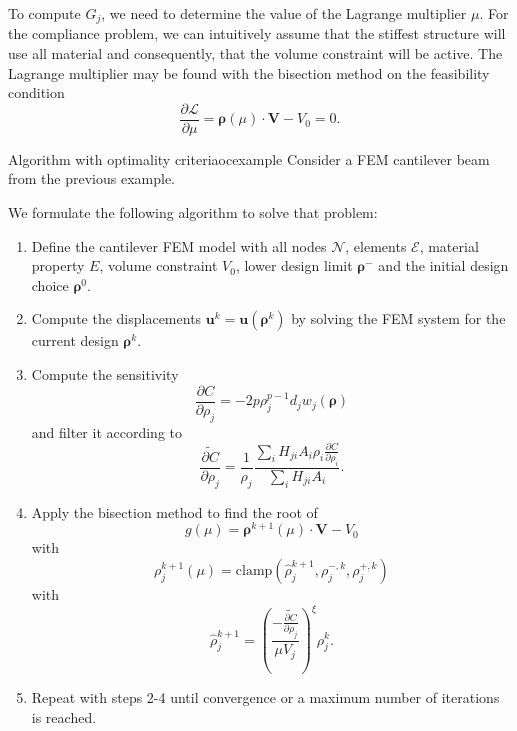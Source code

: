 To compute $G_j$, we need to determine the value of the Lagrange multiplier $\mu$. For the compliance problem, we can intuitively assume that the stiffest structure will use all material and consequently, that the volume constraint will be active. The Lagrange multiplier may be found with the bisection method on the feasibility condition
\begin{equation}
    \frac{\partial \mathcal{L}}{\partial \mu} = \pmb{\rho}(\mu) \cdot \mathbf{V} - V_0 = 0.
\end{equation}

\begin{example}{Algorithm with optimality criteria}{ocexample}
    Consider a FEM cantilever beam from the previous example. 

    We formulate the following algorithm to solve that problem: 
    \begin{enumerate}
        \item Define the cantilever FEM model with all nodes $\mathcal{N}$, elements $\mathcal{E}$, material property $E$, volume constraint $V_0$, lower design limit $\pmb{\rho}^-$ and the initial design choice $\pmb{\rho}^0$.
        \item Compute the displacements $\mathbf{u}^k = \mathbf{u}(\pmb{\rho}^k)$ by solving the FEM system for the current design $\pmb{\rho}^k$.
        \item Compute the sensitivity 
        \begin{equation}
            \frac{\partial C}{\partial \rho_j} = -2 p \rho_j^{p-1} d_j w_j(\pmb{\rho})
        \end{equation}
        and filter it according to
        \begin{equation}
            \widetilde{\frac{\partial C}{\partial \rho_j}} = \frac{1}{\rho_j} \frac{\sum_i H_{ji} A_i \rho_i \frac{\partial C}{\partial \rho_i} }{\sum_i H_{ji} A_i}.
        \end{equation}
        \item Apply the bisection method to find the root of 
            \begin{equation}
                g(\mu) = \pmb{\rho}^{k+1}(\mu) \cdot \mathbf{V} - V_0
            \end{equation}
        with 
        \begin{equation}
            \rho^{k+1}_j(\mu) = \textrm{clamp} \left(\hat{\rho}_j^{k+1}, \rho_j^{-,k}, \rho_j^{+,k} \right)
        \end{equation}
        with
        \begin{equation}
            \hat{\rho}_j^{k+1} = \left(\frac{ - \widetilde{\frac{\partial C}{\partial \rho_j}}}{\mu V_j}\right)^\xi \rho_j^k.
        \end{equation}
        \item Repeat with steps 2-4 until convergence or a maximum number of iterations is reached.
    \end{enumerate}
\end{example}

